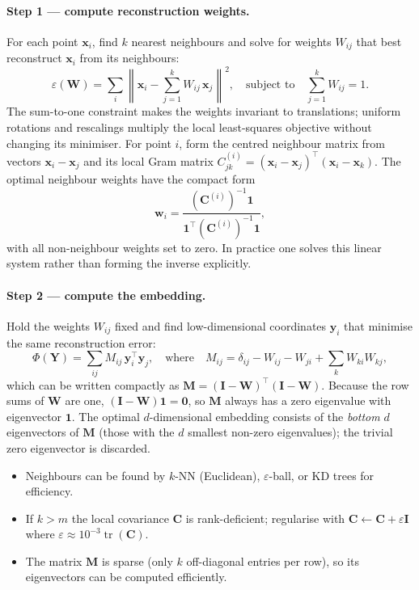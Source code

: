 \documentclass[11pt, oneside]{book}
\newcommand{\T}{^{\top}}
\begin{document}
\paragraph{Step 1 — compute reconstruction weights.}
For each point $\bm{x}_i$, find $k$ nearest neighbours and solve for weights
$W_{ij}$ that best reconstruct $\bm{x}_i$ from its neighbours:
\[
  \varepsilon(\bm{W}) = \sum_i \left\|\bm{x}_i
    - \sum_{j=1}^{k} W_{ij}\,\bm{x}_j\right\|^2,
  \quad\text{subject to}\quad \sum_{j=1}^{k} W_{ij} = 1.
\]
The sum-to-one constraint makes the weights invariant to translations; uniform
rotations and rescalings multiply the local least-squares objective without changing
its minimiser. For point $i$, form the centred neighbour matrix from vectors
$\bm{x}_i-\bm{x}_j$ and its local Gram matrix
$C^{(i)}_{jk}=(\bm{x}_i-\bm{x}_j)\T(\bm{x}_i-\bm{x}_k)$. The optimal neighbour weights
have the compact form
\[
  \bm{w}_i = \frac{(\bm{C}^{(i)})^{-1}\mathbf{1}}
                   {\mathbf{1}\T(\bm{C}^{(i)})^{-1}\mathbf{1}},
\]
with all non-neighbour weights set to zero. In practice one solves this linear system
rather than forming the inverse explicitly.

\paragraph{Step 2 — compute the embedding.}
Hold the weights $W_{ij}$ fixed and find low-dimensional coordinates
$\bm{y}_i$ that minimise the same reconstruction error:
\[
  \Phi(\bm{Y}) = \sum_{ij} M_{ij}\,\bm{y}_i\T\bm{y}_j,
  \quad\text{where}\quad
  M_{ij} = \delta_{ij} - W_{ij} - W_{ji} + \sum_k W_{ki}W_{kj},
\]
which can be written compactly as $\bm{M}=(\bm{I}-\bm{W})\T(\bm{I}-\bm{W})$.
Because the row sums of $\bm{W}$ are one, $(\bm{I}-\bm{W})\mathbf{1}=\mathbf{0}$,
so $\bm{M}$ always has a zero eigenvalue with eigenvector $\mathbf{1}$.
The optimal $d$-dimensional embedding consists of the \emph{bottom} $d$
eigenvectors of $\bm{M}$ (those with the $d$ smallest non-zero eigenvalues);
the trivial zero eigenvector is discarded.

\begin{intbox}[title={LLE implementation notes}]
\begin{itemize}
  \item Neighbours can be found by $k$-NN (Euclidean), $\varepsilon$-ball, or
        KD trees for efficiency.
  \item If $k>m$ the local covariance $\bm{C}$ is rank-deficient; regularise
        with $\bm{C}\leftarrow\bm{C}+\varepsilon\bm{I}$ where
        $\varepsilon\approx 10^{-3}\operatorname{tr}(\bm{C})$.
  \item The matrix $\bm{M}$ is sparse (only $k$ off-diagonal entries per row),
        so its eigenvectors can be computed efficiently.
\end{itemize}
\end{intbox}
\end{document}
